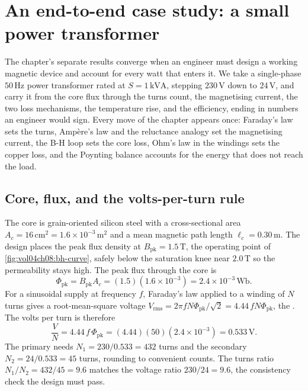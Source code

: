 \section{An end-to-end case study: a small power transformer}

The chapter's separate results converge when an engineer must design a
working magnetic device and account for every watt that enters it. We
take a single-phase $50\,\text{Hz}$ power transformer rated at
$S = 1\,\text{kVA}$, stepping $230\,\si{\volt}$ down to $24\,\si{\volt}$,
and carry it from the core flux through the turns count, the magnetising
current, the two loss mechanisms, the temperature rise, and the
efficiency, ending in numbers an engineer would sign. Every move of the
chapter appears once: Faraday's law sets the turns, Amp\`ere's law and
the reluctance analogy set the magnetising current, the B-H loop sets the
core loss, Ohm's law in the windings sets the copper loss, and the
Poynting balance accounts for the energy that does not reach the load.

\subsection{Core, flux, and the volts-per-turn rule}

The core is grain-oriented silicon steel with a cross-sectional area
$A_c = 16\,\si{\centi\meter\squared} = 1.6\times 10^{-3}\,\si{\meter
\squared}$ and a mean magnetic path length $\ell_c = 0.30\,\si{\meter}$.
The design places the peak flux density at $B_{\text{pk}} = 1.5\,\si{
\tesla}$, the operating point of \cref{fig:vol04ch08:bh-curve}, safely
below the saturation knee near $2.0\,\si{\tesla}$ so the permeability
stays high. The peak flux through the core is
\[
\Phi_{\text{pk}} = B_{\text{pk}} A_c = (1.5)(1.6\times 10^{-3}) =
2.4\times 10^{-3}\,\si{\weber}.
\]
For a sinusoidal supply at frequency $f$, Faraday's law applied to a
winding of $N$ turns gives a root-mean-square voltage $V_{\text{rms}} =
2\pi f N \Phi_{\text{pk}}/\sqrt{2} = 4.44\, f N \Phi_{\text{pk}}$, the
. The volts per turn is therefore
\[
\frac{V}{N} = 4.44\, f\,\Phi_{\text{pk}} = (4.44)(50)(2.4\times 10^{-3})
= 0.533\,\si{\volt}.
\]
The primary needs $N_1 = 230/0.533 = 432$ turns and the secondary
$N_2 = 24/0.533 = 45$ turns, rounding to convenient counts. The turns
ratio $N_1/N_2 = 432/45 = 9.6$ matches the voltage ratio $230/24 = 9.6$,
the consistency check the design must pass.



